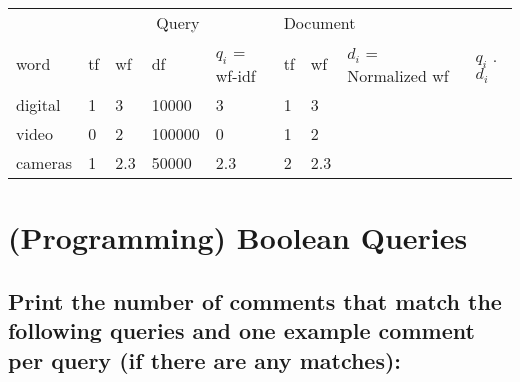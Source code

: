 \documentclass{scrartcl}
\begin{document}
\begin{table}[]
\centering
\begin{tabular}{lllllllll}
                             & \multicolumn{4}{c}{Query}         & \multicolumn{3}{l}{Document}    &             \\ \cline{2-8}
word                         & tf & wf  & df  & $q_i$ = wf-idf & tf & wf  & $d_i$ = Normalized wf & $q_i$ . $d_i$ \\ \hline
\multicolumn{1}{l|}{digital} & 1  & 3   & 10000  & 3             & 1  & 3   &                      &             \\
\multicolumn{1}{l|}{video}   & 0  & 2   & 100000 & 0             & 1  & 2   &                      &             \\
\multicolumn{1}{l|}{cameras} & 1  & 2.3 & 50000  & 2.3           & 2  & 2.3 &                      &            
\end{tabular}
\end{table}


\section{(Programming) Boolean Queries
}

\subsection{Print the number of comments that match the following queries and one example comment
	per query (if there are any matches):}
\end{document}
